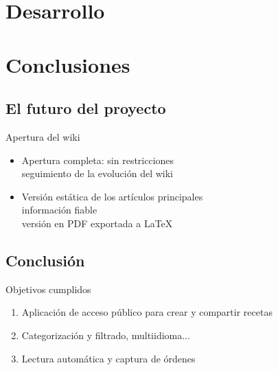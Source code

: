 \documentclass[10pt,xcolor=svgnames]{beamer}
\begin{document}
\section{Desarrollo}




\section{Conclusiones}

\subsection{El futuro del proyecto}

\begin{frame}{Apertura del wiki}
  \transdissolve
  
  \begin{itemize}
  \item Apertura completa: sin restricciones\\
    \then{} seguimiento de la evolución del wiki

    \vspace*{0.5cm}
  \item Versión estática de los artículos principales\\
    \then{} información fiable\\
    \then{} versión en PDF exportada a \LaTeX{}
  \end{itemize}
  
\end{frame}

\subsection{Conclusión}

\begin{frame}{Objetivos cumplidos}
  \transdissolve

  \begin{enumerate}
  \item<1-3> Aplicación de acceso público para crear y compartir recetas

    \vspace*{0.2cm}
  \item<2-3> Categorización y filtrado, multiidioma...

    \vspace*{0.2cm}
  \item<3> Lectura automática y captura de órdenes
  \end{enumerate}  
  
\end{frame}
\end{document}
